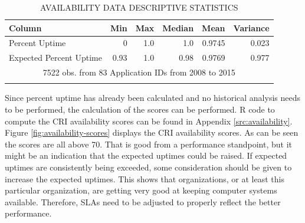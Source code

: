 \documentclass[SDSUThesis.tex]{subfiles}
\begin{document}
        \begin{longtable}{@{}l rr rrr}
            \toprule%
             \centering%
             {\bfseries Column}
             & {\bfseries Min}
             & {\bfseries Max}
             & {\bfseries Median}
             & {\bfseries Mean}
             & {\bfseries Variance} \\
            
            \cmidrule[0.2pt](r{0.125em}){1-1}%
            \cmidrule[0.2pt](lr{0.125em}){2-2}%
            \cmidrule[0.2pt](l{0.125em}){3-3}%
            \cmidrule[0.2pt](l{0.125em}){4-4}%
            \cmidrule[0.2pt](l{0.125em}){5-5}%
            \endhead
            
            Percent Uptime & 0 & 1.0 & 1.0 & 0.9745 & 0.023 \\
            \myrowcolour%
            Expected Percent Uptime & 0.93 & 1.0 & 0.98 & 0.9769  & 0.977\\
            
            \bottomrule
            
            \multicolumn{6}{c}{7522 obs. from 83 Application IDs from 2008 to 2015} \\
            
            \caption{AVAILABILITY DATA DESCRIPTIVE STATISTICS}
            \label{tab:availability_desc}
        \end{longtable}
        
        Since percent uptime has already been calculated and no historical
        analysis needs to be performed, the calculation of the scores
        can be performed. 
        R code to compute the CRI availability scores can be found in Appendix
        \ref{src:availability}. Figure \ref{fig:availability-scores} displays
        the CRI availability scores.  As can be seen the scores are all above
        70.  That is good from a performance standpoint, but it might be an
        indication that the expected uptimes could be raised.  If expected
        uptimes are consistently being exceeded, some consideration should
        be given to increase the expected uptimes.  This shows that
        organizations, or at least this particular organization, are getting
        very good at keeping computer systems available.  Therefore,
        SLAs need to be adjusted to properly reflect the better performance.
        
\end{document}
